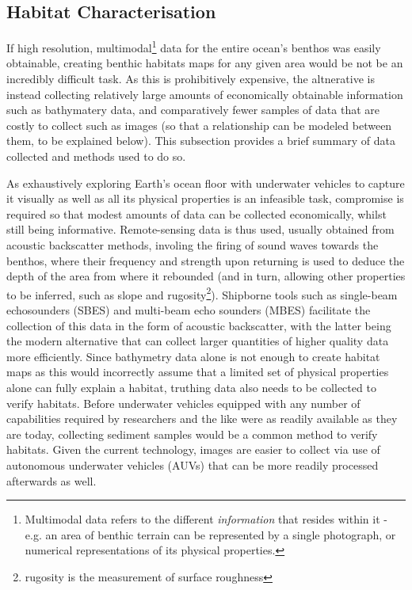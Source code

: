 \subsection{Habitat Characterisation}
If high resolution, multimodal\footnote{Multimodal data refers to the different \textit{information} that resides within it - e.g. an area of benthic terrain can be represented by a single photograph, or numerical representations of its physical properties.} data for the entire ocean's benthos was easily obtainable, creating benthic habitats maps for any given area would be not be an incredibly difficult task. As this is prohibitively expensive, the altnerative is instead collecting relatively large amounts of economically obtainable information such as bathymatery data, and comparatively fewer samples of data that are costly to collect such as images (so that a relationship can be modeled between them, to be explained below). This subsection provides a brief summary of data collected and methods used to do so.

As exhaustively exploring Earth's ocean floor with underwater vehicles to capture it visually as well as all its physical properties is an infeasible task, compromise is required so that modest amounts of data can be collected economically, whilst still being informative. Remote-sensing data is thus used, usually obtained from acoustic backscatter methods, involing the firing of sound waves towards the benthos, where their frequency and strength upon returning is used to deduce the depth of the area from where it rebounded (and in turn, allowing other properties to be inferred, such as slope and rugosity\footnote{rugosity is the measurement of surface roughness}). Shipborne tools such as single-beam echosounders (SBES) and multi-beam echo sounders (MBES) facilitate the collection of this data in the form of acoustic backscatter, with the latter being the modern alternative that can collect larger quantities of higher quality data more efficiently\citep{calvert15}. Since bathymetry data alone is not enough to create habitat maps as this would incorrectly assume that a limited set of physical properties alone can fully explain a habitat, truthing data also needs to be collected to verify habitats. Before underwater vehicles equipped with any number of capabilities required by researchers and the like were as readily available as they are today, collecting sediment samples would be a common method to verify habitats. Given the current technology, images are easier to collect via use of autonomous underwater vehicles (AUVs) that can be more readily processed afterwards as well. 

